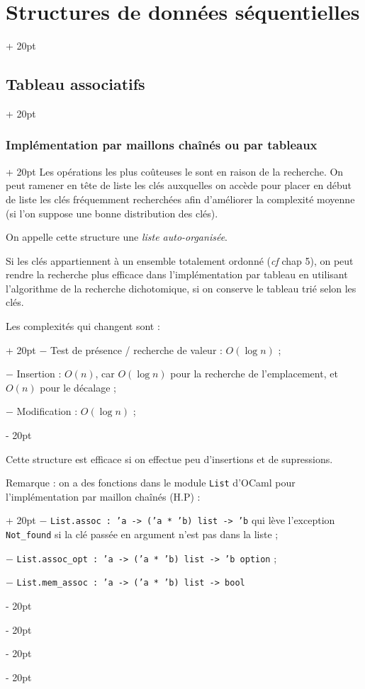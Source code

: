 \documentclass[a4paper, 12pt, twoside]{article}
\newcommand{\ind}[1][20pt]{\advance\leftskip + #1}
\newcommand{\deind}[1][20pt]{\advance\leftskip - #1}
\newenvironment{indt}[2][20pt]{#2 \par \ind[#1]}{\par \deind} %
\begin{document}
\begin{indt}{\section{Structures de données séquentielles}}
\begin{indt}{\subsection{Tableau associatifs}}
\begin{indt}{\subsubsection{Implémentation par maillons chaînés ou par tableaux}}
                Les opérations les plus coûteuses le sont en raison de la recherche. On peut ramener en tête de liste les clés auxquelles on accède pour placer en début de liste les clés fréquemment recherchées afin d'améliorer la complexité moyenne (si l'on suppose une bonne distribution des clés).
                
                On appelle cette structure une \textit{liste auto-organisée}.
                
                \vspace{6pt}
                
                Si les clés appartiennent à un ensemble totalement ordonné (\textit{cf} chap 5), on peut rendre la recherche plus efficace dans l'implémentation par tableau en utilisant l'algorithme de la recherche dichotomique, si on conserve le tableau trié selon les clés.
                
                \begin{indt}{Les complexités qui changent sont :}
                    $-$ Test de présence / recherche de valeur : $O(\log n)$ ;
                    
                    $-$ Insertion : $O(n)$, car $O(\log n)$ pour la recherche de l'emplacement, et $O(n)$ pour le décalage ;
                    
                    $-$ Modification : $O(\log n)$ ;
                \end{indt}
                
                \vspace{6pt}
                
                Cette structure est efficace si on effectue peu d'insertions et de supressions.
                
                \vspace{6pt}
                
                \begin{indt}{Remarque : on a des fonctions dans le module \texttt{List} d'OCaml pour l'implémentation par maillon chaînés (H.P) :}
                    $-$ \texttt{List.assoc : 'a -> ('a * 'b) list -> 'b} qui lève l'exception \texttt{Not\_found} si la clé passée en argument n'est pas dans la liste ;
                    
                    $-$ \texttt{List.assoc\_opt : 'a -> ('a * 'b) list -> 'b option} ;
                    
                    $-$ \texttt{List.mem\_assoc : 'a -> ('a * 'b) list -> bool}
                    

\end{indt}
\end{indt}
\end{indt}
\end{indt}
\end{document}
